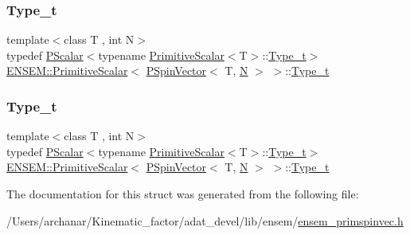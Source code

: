 \subsubsection{\texorpdfstring{Type\_t}{Type\_t}\hspace{0.1cm}{\footnotesize\ttfamily [1/2]}}
{\footnotesize\ttfamily template$<$class T , int N$>$ \\
typedef \mbox{\hyperlink{classENSEM_1_1PScalar}{P\+Scalar}}$<$typename \mbox{\hyperlink{structENSEM_1_1PrimitiveScalar}{Primitive\+Scalar}}$<$T$>$\+::\mbox{\hyperlink{structENSEM_1_1PrimitiveScalar_3_01PSpinVector_3_01T_00_01N_01_4_01_4_ae74b3341c6408b55d594cc603d4ee470}{Type\+\_\+t}}$>$ \mbox{\hyperlink{structENSEM_1_1PrimitiveScalar}{E\+N\+S\+E\+M\+::\+Primitive\+Scalar}}$<$ \mbox{\hyperlink{classENSEM_1_1PSpinVector}{P\+Spin\+Vector}}$<$ T, \mbox{\hyperlink{operator__name__util_8cc_a7722c8ecbb62d99aee7ce68b1752f337}{N}} $>$ $>$\+::\mbox{\hyperlink{structENSEM_1_1PrimitiveScalar_3_01PSpinVector_3_01T_00_01N_01_4_01_4_ae74b3341c6408b55d594cc603d4ee470}{Type\+\_\+t}}}

\mbox{\label{structENSEM_1_1PrimitiveScalar_3_01PSpinVector_3_01T_00_01N_01_4_01_4_ae74b3341c6408b55d594cc603d4ee470}} 
\subsubsection{\texorpdfstring{Type\_t}{Type\_t}\hspace{0.1cm}{\footnotesize\ttfamily [2/2]}}
{\footnotesize\ttfamily template$<$class T , int N$>$ \\
typedef \mbox{\hyperlink{classENSEM_1_1PScalar}{P\+Scalar}}$<$typename \mbox{\hyperlink{structENSEM_1_1PrimitiveScalar}{Primitive\+Scalar}}$<$T$>$\+::\mbox{\hyperlink{structENSEM_1_1PrimitiveScalar_3_01PSpinVector_3_01T_00_01N_01_4_01_4_ae74b3341c6408b55d594cc603d4ee470}{Type\+\_\+t}}$>$ \mbox{\hyperlink{structENSEM_1_1PrimitiveScalar}{E\+N\+S\+E\+M\+::\+Primitive\+Scalar}}$<$ \mbox{\hyperlink{classENSEM_1_1PSpinVector}{P\+Spin\+Vector}}$<$ T, \mbox{\hyperlink{operator__name__util_8cc_a7722c8ecbb62d99aee7ce68b1752f337}{N}} $>$ $>$\+::\mbox{\hyperlink{structENSEM_1_1PrimitiveScalar_3_01PSpinVector_3_01T_00_01N_01_4_01_4_ae74b3341c6408b55d594cc603d4ee470}{Type\+\_\+t}}}



The documentation for this struct was generated from the following file\+:\begin{DoxyCompactItemize}
\item 
/\+Users/archanar/\+Kinematic\+\_\+factor/adat\+\_\+devel/lib/ensem/\mbox{\hyperlink{lib_2ensem_2ensem__primspinvec_8h}{ensem\+\_\+primspinvec.\+h}}\end{DoxyCompactItemize}
